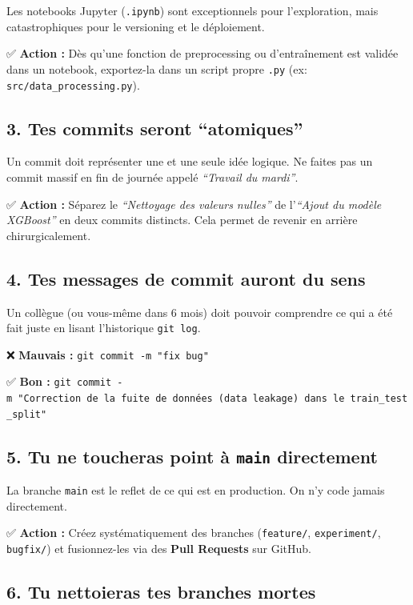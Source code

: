 \documentclass[
  letterpaper,
  DIV=11,
  numbers=noendperiod]{scrreprt}
\begin{document}
Les notebooks Jupyter (\texttt{.ipynb}) sont exceptionnels pour
l'exploration, mais catastrophiques pour le versioning et le
déploiement.

✅ \textbf{Action :} Dès qu'une fonction de preprocessing ou
d'entraînement est validée dans un notebook, exportez-la dans un script
propre \texttt{.py} (ex: \texttt{src/data\_processing.py}).

\subsection{3. Tes commits seront
``atomiques''}\label{tes-commits-seront-atomiques}

Un commit doit représenter une et une seule idée logique. Ne faites pas
un commit massif en fin de journée appelé \emph{``Travail du mardi''}.

✅ \textbf{Action :} Séparez le \emph{``Nettoyage des valeurs nulles''}
de l'\emph{``Ajout du modèle XGBoost''} en deux commits distincts. Cela
permet de revenir en arrière chirurgicalement.

\subsection{4. Tes messages de commit auront du
sens}\label{tes-messages-de-commit-auront-du-sens}

Un collègue (ou vous-même dans 6 mois) doit pouvoir comprendre ce qui a
été fait juste en lisant l'historique \texttt{git\ log}.

❌ \textbf{Mauvais :} \texttt{git\ commit\ -m\ "fix\ bug"}

✅ \textbf{Bon :}
\texttt{git\ commit\ -m\ "Correction\ de\ la\ fuite\ de\ données\ (data\ leakage)\ dans\ le\ train\_test\_split"}

\subsection{\texorpdfstring{5. Tu ne toucheras point à \texttt{main}
directement}{5. Tu ne toucheras point à main directement}}\label{tu-ne-toucheras-point-uxe0-main-directement}

La branche \texttt{main} est le reflet de ce qui est en production. On
n'y code jamais directement.

✅ \textbf{Action :} Créez systématiquement des branches
(\texttt{feature/}, \texttt{experiment/}, \texttt{bugfix/}) et
fusionnez-les via des \textbf{Pull Requests} sur GitHub.

\subsection{6. Tu nettoieras tes branches
mortes}\label{tu-nettoieras-tes-branches-mortes}
\end{document}
